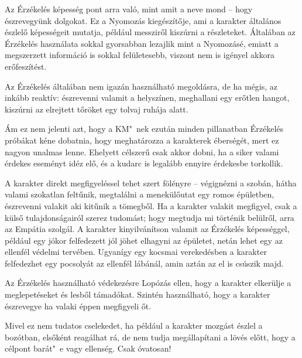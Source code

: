 
Az Érzékelés képesség pont arra való, mint amit a neve mond -- hogy észrevegyünk dolgokat. Ez a Nyomozás kiegészítője, ami a karakter általános észlelő képességeit mutatja, például messziről kiszúrni a részleteket. Általában az Érzékelés használata sokkal gyorsabban lezajlik mint a Nyomozásé, emiatt a megszerzett információ is sokkal felületesebb, viszont nem is igényel akkora erőfeszítést.

\overcome Az Érzékelés általában nem igazán használható megoldásra, de ha mégis, az inkább reaktív: észrevenni valamit a helyszínen, meghallani egy erőtlen hangot, kiszúrni az elrejtett tőröket egy tolvaj ruhája alatt.

Ám ez nem jelenti azt, hogy a KM"~nek ezután minden pillanatban Érzékelés próbákat kéne dobatnia, hogy meghatározza a karakterek éberségét, mert ez nagyon unalmas lenne. Ehelyett célszerű csak akkor dobni, ha a siker valami érdekes eseményt idéz elő, és a kudarc is legalább ennyire érdekesbe torkollik.

\advantage A karakter direkt megfigyeléssel tehet szert fölényre -- végignézni a szobán, hátha valami szokatlan feltűnik, megtalálni a menekülőutat egy romos épületben, észrevenni valakit aki kitűnik a tömegből. Ha a karakter valakit megfigyel, csak a külső tulajdonságairól szerez tudomást; hogy megtudja mi történik belülről, arra az Empátia szolgál. A karakter kinyilvánítson valamit az Érzékelés képességgel, például egy jókor felfedezett  jól jöhet elhagyni az épületet, netán lehet egy  az ellenfél védelmi tervében. Ugyanígy egy kocsmai verekedésben a karakter felfedezhet egy pocsolyát az ellenfél lábánál, amin aztán az el is csúszik majd.

\noattackatall

 Az Érzékelés használható védekezésre Lopózás ellen, hogy a karakter elkerülje a meglepetéseket és lesből támadókat. Szintén használható, hogy a karakter észrevegye ha valaki éppen megfigyeli őt.




Mivel ez nem tudatos cselekedet, ha például a karakter mozgást észlel a bozótban, elsőként reagálhat rá, de nem tudja megállapítani a lövés előtt, hogy a célpont barát"~e vagy ellenség. Csak óvatosan!
